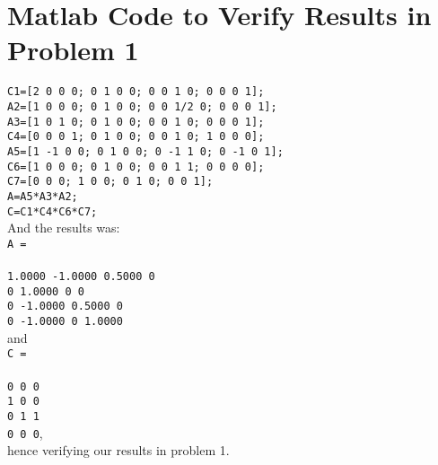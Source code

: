 \documentclass[11pt]{article}
\begin{document}
\newpage
\appendix{}
\section{Matlab Code to Verify Results in Problem 1}
\texttt
{C1=[2 0 0 0; 0 1 0 0; 0 0 1 0; 0 0 0 1];\\
A2=[1 0 0 0; 0 1 0 0; 0 0 1/2 0; 0 0 0 1];\\
A3=[1 0 1 0; 0 1 0 0; 0 0 1 0; 0 0 0 1];\\
C4=[0 0 0 1; 0 1 0 0; 0 0 1 0; 1 0 0 0];\\
A5=[1 -1 0 0; 0 1 0 0; 0 -1 1 0; 0 -1 0 1];\\
C6=[1 0 0 0; 0 1 0 0; 0 0 1 1; 0 0 0 0];\\
C7=[0 0 0; 1 0 0; 0 1 0; 0 0 1];\\
A=A5*A3*A2;\\
C=C1*C4*C6*C7;\\}
And the results was:\\ 
\texttt
{A =\\
\\    1.0000   -1.0000    0.5000         0\\
         0    1.0000         0         0\\
         0   -1.0000    0.5000         0\\
         0   -1.0000         0    1.0000\\}
and \\
\texttt
{C =\\
\\  
     0     0     0\\
     1     0     0\\
     0     1     1\\
     0     0     0}, \\
hence verifying our results in problem 1.
\newpage
\end{document}
